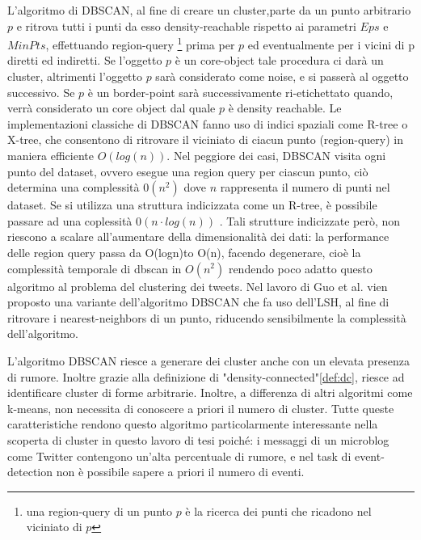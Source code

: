 L'algoritmo di DBSCAN, al fine di creare un cluster,parte da un punto arbitrario $p$ e ritrova tutti i punti da esso density-reachable rispetto ai parametri $Eps$ e $MinPts$, effettuando region-query \footnote{una region-query  di un punto $p$ è la ricerca dei punti che ricadono nel viciniato di $p$} prima per $p$ ed eventualmente per i vicini di p diretti ed indiretti.
Se l'oggetto $p$ è un core-object tale procedura ci darà un cluster, altrimenti l'oggetto $p$ sarà considerato come noise, e si passerà al oggetto successivo. Se $p$ è un border-point sarà successivamente ri-etichettato quando, verrà considerato un core object dal quale $p$ è density reachable.
Le implementazioni classiche di DBSCAN fanno uso di indici spaziali come R-tree o X-tree, che consentono di ritrovare il viciniato di ciacun punto (region-query) in maniera efficiente $O(log(n))$. Nel peggiore dei casi, DBSCAN visita ogni punto del dataset, ovvero esegue una region query per ciascun punto, ciò determina una complessità $0(n^2)$  dove $n$ rappresenta il numero di punti nel dataset. Se si utilizza una struttura indicizzata come un R-tree, è possibile passare ad una coplessità $0(n \cdot log(n))$ . 
Tali strutture indicizzate però, non riescono a scalare all'aumentare della dimensionalità dei dati: la performance delle region query passa da  O(logn)to O(n), facendo degenerare, cioè la complessità temporale di dbscan in $O(n^2)$ rendendo poco adatto questo algoritmo al problema del clustering dei tweets. Nel lavoro di Guo et al. \cite{4370588} vien proposto una variante dell'algoritmo DBSCAN che fa uso dell'LSH, al fine di ritrovare i nearest-neighbors di un punto, riducendo sensibilmente la complessità dell'algoritmo.
 
L'algoritmo DBSCAN riesce  a generare dei cluster anche con un elevata presenza di rumore. Inoltre grazie alla definizione di "density-connected"\ref{def:dc}, riesce ad identificare cluster di forme arbitrarie. Inoltre, a differenza di altri algoritmi come k-means, non necessita di conoscere a priori il numero di cluster. Tutte queste caratteristiche rendono questo algoritmo particolarmente interessante nella scoperta di cluster in questo lavoro di tesi poiché: i messaggi di un microblog come Twitter contengono un'alta percentuale di rumore, e nel task di event-detection non è possibile sapere a priori il numero di eventi.
